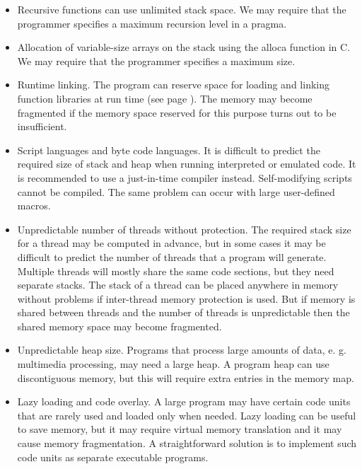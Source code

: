 \documentclass[forwardcom.tex]{subfiles}
\begin{document}
\begin{itemize}
\item Recursive functions can use unlimited stack space. We may require that the programmer specifies a maximum recursion level in a pragma.

\item Allocation of variable-size arrays on the stack using the alloca function in C. We may require that the programmer specifies a maximum size. 

\item Runtime linking. The program can reserve space for loading and linking function libraries at run time (see page \pageref{runtimeLinking}). The memory may become fragmented if the memory space reserved for this purpose turns out to be insufficient.

\item Script languages and byte code languages. It is difficult to predict the required size of stack and heap when running interpreted or emulated code. It is recommended to use a just-in-time compiler instead. Self-modifying scripts cannot be compiled. The same problem can occur with large user-defined macros.

\item Unpredictable number of threads without protection. The required stack size for a thread may be computed in advance, but in some cases it may be difficult to predict the number of threads that a program will generate. Multiple threads will mostly share the same code sections, but they need separate stacks. The stack of a thread can be placed anywhere in memory without problems if inter-thread memory protection is used. But if memory is shared between threads and the number of threads is unpredictable then the shared 
memory space may become fragmented. 

\item Unpredictable heap size. Programs that process large amounts of data, e. g. multimedia processing, may need a large heap. A program heap can use discontiguous memory, but this will require extra entries in the memory map. 

\item Lazy loading and code overlay. A large program may have certain code units that are rarely used and loaded only when needed. Lazy loading can be useful to save memory, but it may require virtual memory translation and it may cause memory fragmentation. A straightforward solution is to implement such code units as separate executable programs. 


\end{itemize}
\end{document}
